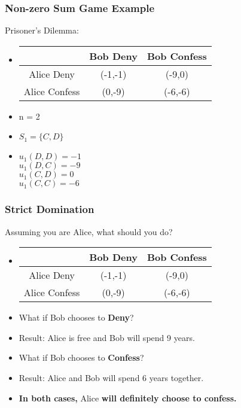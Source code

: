 \documentclass{beamer}
\begin{document}
\begin{frame}
\frametitle{Non-zero Sum Game Example}
Prisoner's Dilemma:\\
\begin{itemize}[<+->]
\item
\begin{tabular}{|c|c|c|}
\hline
\hline
    &{\color{red}Bob} Deny&{\color{red}Bob} Confess\\
\hline
{\color{blue}Alice} Deny& ({\color{blue}-1},{\color{red}-1}) & ({\color{blue}-9},{\color{red}0})\\
\hline
{\color{blue}Alice} Confess& ({\color{blue}0},{\color{red}-9}) & ({\color{blue}-6},{\color{red}-6})\\
\hline
\hline
\end{tabular}
\item
n = 2
\item
{\color{blue}$S_1 = \{ C, D\}$}  
\item
{\color{blue}$u_1(D,D) = -1$} \\
{\color{blue}$u_1(D,C) = -9$} \\
{\color{blue}$u_1(C,D) = 0 $} \text{ } \\
{\color{blue}$u_1(C,C) = -6$} 
\end{itemize}
\end{frame}

\begin{frame}
\frametitle{Strict Domination}
Assuming you are {\color{blue}Alice}, what should you do?\\
\begin{itemize}[<+->]
\item
\begin{tabular}{|c|c|c|}
\hline
\hline
    &{\color{red}Bob} Deny&{\color{red}Bob} Confess\\
\hline
{\color{blue}Alice} Deny& ({\color{blue}-1},{\color{red}-1}) & ({\color{blue}-9},{\color{red}0})\\
\hline
{\color{blue}Alice} Confess& ({\color{blue}0},{\color{red}-9}) & ({\color{blue}-6},{\color{red}-6})\\
\hline
\hline
\end{tabular}

\item 
What if {\color{red}Bob} chooses to \textbf{Deny}?
\item
Result: {\color{blue}Alice} is free and {\color{red}Bob} will spend 9 years.
\item
What if {\color{red}Bob} chooses to \textbf{Confess}?
\item
Result: {\color{blue}Alice} and {\color{red}Bob} will spend 6 years together.
\item
\textbf{In both cases, }{\color{blue}Alice}\textbf{ will definitely choose to confess.}
\end{itemize}
\end{frame}
\end{document}
